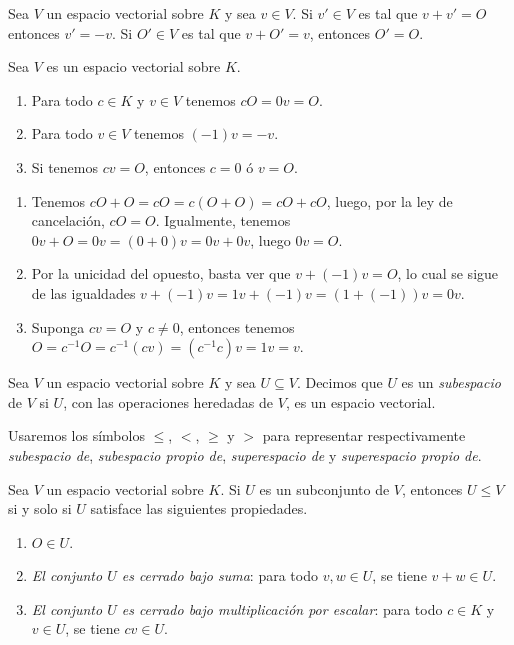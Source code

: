 \begin{coro}
Sea $V$ un espacio vectorial sobre $K$ y sea $v\in V$. Si $v'\in V$ es tal que $v+v'=O$ entonces $v'=-v$. Si $O'\in V$ es tal que $v+O'=v$, entonces $O'=O$.
\end{coro}

\begin{pro}
Sea $V$ es un espacio vectorial sobre $K$.
\begin{enumerate}
\item Para todo $c\in K$ y $v\in V$ tenemos $cO=0v=O$.
\item Para todo $v\in V$ tenemos $(-1)v=-v$.
\item Si tenemos $cv=O$, entonces $c=0$ \'o $v=O$.
\end{enumerate}
\end{pro}

\dem
\begin{enumerate}
\item Tenemos $cO+O=cO=c(O+O)=cO+cO$, luego, por la ley de cancelaci\'on, $cO=O$. Igualmente, tenemos $0v+O=0v=(0+0)v=0v+0v$, luego $0v=O$.
\item Por la unicidad del opuesto, basta ver que $v+(-1)v=O$, lo cual se sigue de las igualdades $v+(-1)v=1v+(-1)v=\left(1+(-1)\right)v=0v$.
\item Suponga $cv=O$ y $c\ne 0$, entonces tenemos $O=c^{-1}O=c^{-1}(cv)=(c^{-1}c)v=1v=v$.
\end{enumerate}

\begin{defn}
Sea $V$ un espacio vectorial sobre $K$ y sea $U\subseteq V$. Decimos que $U$ es un \emph{subespacio} de $V$ si $U$, con las operaciones heredadas de $V$, es un espacio vectorial.
\end{defn}

\begin{nota}
Usaremos los s\'imbolos $\le$, $<$, $\ge$ y $>$ para representar respectivamente \emph{subespacio de}, \emph{subespacio propio de}, \emph{superespacio de} y \emph{superespacio propio de}.
\end{nota}

\begin{pro}\label{subespsiysolosi}
Sea $V$ un espacio vectorial sobre $K$. Si $U$ es un subconjunto de $V$, entonces $U\le V$ si y solo si $U$ satisface las siguientes propiedades.
\begin{enumerate}
\item $O\in U$.
\item \emph{El conjunto $U$ es cerrado bajo suma}: para todo $v,w\in U$, se tiene $v+w\in U$.
\item \emph{El conjunto $U$ es cerrado bajo multiplicaci\'on por escalar}: para todo $c\in K$ y $v\in U$, se tiene $cv\in U$.
\end{enumerate} 
\end{pro}

